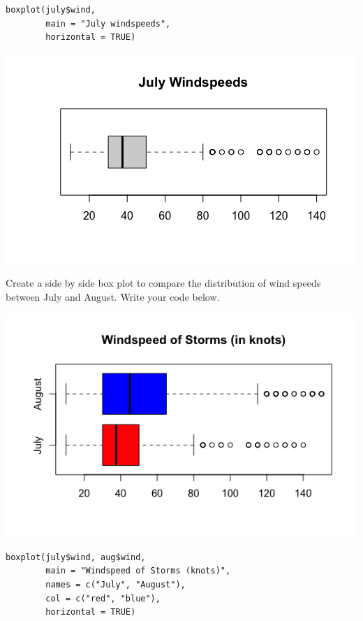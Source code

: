 \begin{multicols}{2}

\begin{lstlisting}
boxplot(july$wind, 
        main = "July windspeeds", 
        horizontal = TRUE)
\end{lstlisting}

\columnbreak

\includegraphics[width=0.45\tw]{02/fig-july-box.png}

\end{multicols}

\ii Create a side by side box plot to compare the distribution of wind speeds between July and August. Write your code below. \vfill

\begin{multicols}{2}

\includegraphics[width=0.45\tw]{02/fig-sidebyside.png}

\columnbreak

\begin{lstlisting}
boxplot(july$wind, aug$wind, 
        main = "Windspeed of Storms (knots)", 
        names = c("July", "August"), 
        col = c("red", "blue"), 
        horizontal = TRUE)
\end{lstlisting}

\end{multicols}


